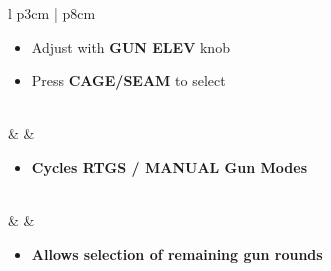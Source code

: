 \documentclass[8pt,usenames,dvipsnames,twoside]{article}
\begin{document}
\begin{center}
\begin{longtable}{l p{3cm} | p{8cm}}
\begin{minipage}[t]{\linewidth}
\begin{itemize}
\begin{itemize}
							\item Adjust with \textbf{GUN ELEV} knob
							\item Press \textbf{CAGE/SEAM} to select
						\end{itemize}
					\end{itemize}
				\end{minipage} \\
				\midrule
				\textbullet &   \hfill\null {} & 
				\begin{minipage}[t]{\linewidth}
					\vspace{-7pt}
					\begin{itemize}
						\item \textbf{Cycles RTGS / MANUAL Gun Modes}
					\end{itemize}
				\end{minipage} \\
				\midrule
				\textbullet &  & 
				\begin{minipage}[t]{\linewidth}
					\vspace{-7pt}
					\begin{itemize}
						\item \textbf{Allows selection of remaining gun rounds}
					\end{itemize}
				\end{minipage} \\
				\bottomrule
			\end{longtable}
		\end{center}
		
\end{document}
